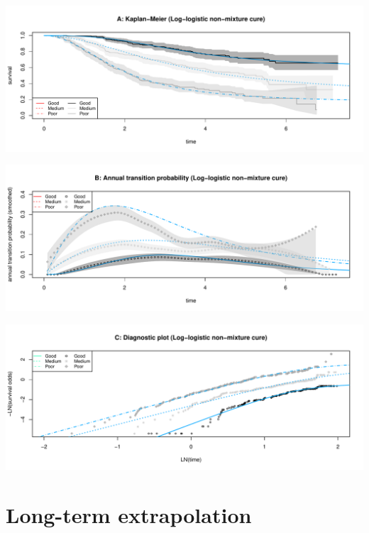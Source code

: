 \documentclass[]{article}
\begin{document}
\begin{flushleft}\includegraphics[height=0.25\textheight]{Images/cure_llog_nmix-1} \end{flushleft}

\begin{flushleft}\includegraphics[height=0.25\textheight]{Images/cure_llog_nmix-2} \end{flushleft}

\begin{flushleft}\includegraphics[height=0.25\textheight]{Images/cure_llog_nmix-3} \end{flushleft}

\newpage

\section{Long-term extrapolation}\label{long-term-extrapolation}
\end{document}
